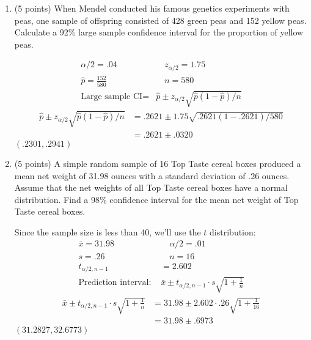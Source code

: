 \documentclass[12pt, letter]{article}
\begin{document}
\begin{enumerate}
	\pagebreak
	
	\setcounter{enumi}{8}
	\item (5 points) When Mendel conducted his famous genetics experiments with peas, one sample of offspring consisted of 428 green peas and 152 yellow peas. Calculate a 92\% large sample confidence interval for the proportion of yellow peas.
	\begin{center}
		\begingroup
		\addtolength{\jot}{1em}
		\begin{align*}
			\alpha/2 = .04 \quad & \quad z_{\alpha/2} = 1.75 \\
			\hat{p} = \frac{152}{580} \quad & \quad n = 580 \\
			\text{Large sample CI} = &\hat{p} \pm z_{\alpha/2}\sqrt{\hat{p}(1 - \hat{p})/n}
		\end{align*}
		\endgroup
		\begin{align*}
			\hat{p} \pm z_{\alpha/2}\sqrt{\hat{p}(1 - \hat{p})/n} &= .2621 \pm 1.75\sqrt{.2621(1 - .2621)/580} \\
			&= .2621 \pm .0320
		\end{align*}
		$\boxed{(.2301, .2941)}$
	\end{center}
	
	\item (5 points) A simple random sample of 16 Top Taste cereal boxes produced a mean net weight of 31.98 ounces with a standard deviation of .26 ounces. Assume that the net weights of all Top Taste cereal boxes have a normal distribution. Find a 98\% confidence interval for the mean net weight of Top Taste cereal boxes.
	\begin{center}
		Since the sample size is less than 40, we'll use the $t$ distribution:
		\begin{align*}
			\bar{x} = 31.98 \quad & \quad \alpha/2 = .01 \\
			s = .26 \quad & \quad n = 16 \\
			t_{\alpha/2, n-1} &= 2.602 \\
			\text{Prediction interval: } & \bar{x} \pm t_{\alpha/2, n-1} \cdot s\sqrt{1 + \frac{1}{n}}
		\end{align*}
		\begin{align*}
			\bar{x} \pm t_{\alpha/2, n-1} \cdot s\sqrt{1 + \frac{1}{n}} &= 31.98 \pm 2.602 \cdot .26\sqrt{1 + \frac{1}{16}} \\
			&= 31.98 \pm .6973
		\end{align*}
		$\boxed{(31.2827, 32.6773)}$
	\end{center}
	

\end{enumerate}
\end{document}
